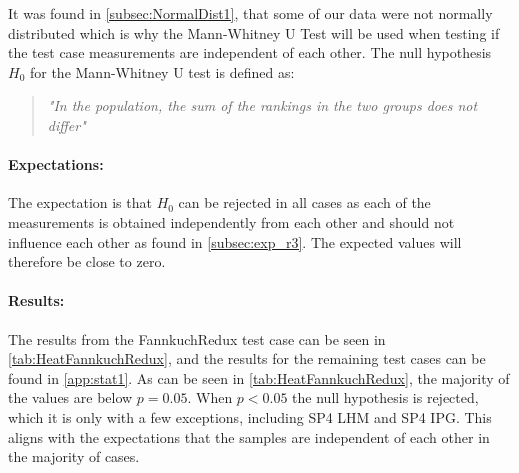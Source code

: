  It was found in \cref{subsec:NormalDist1}, that some of our data were not normally distributed which is why the Mann-Whitney U Test will be used when testing if the test case measurements are independent of each other. The null hypothesis $H_0$ for the Mann-Whitney U test is defined as:

\begin{quote}
    \textit{"In the population, the sum of the rankings in the two groups does not differ"}\cite[]{mann1947test}
\end{quote}

\paragraph{Expectations:} The expectation is that $H_0$ can be rejected in all cases as each of the measurements is obtained independently from each other and should not influence each other as found in \cref{subsec:exp_r3}. The expected values will therefore be close to zero.

\paragraph{Results:}
The results from the FannkuchRedux test case can be seen in \cref{tab:HeatFannkuchRedux}, and the results for the remaining test cases can be found in \cref{app:stat1}. As can be seen in \cref{tab:HeatFannkuchRedux}, the majority of the values are below $p = 0.05$. When $p < 0.05$ the null hypothesis is rejected, which it is only with a few exceptions, including SP4 LHM and SP4 IPG. This aligns with the expectations that the samples are independent of each other in the majority of cases.

 


